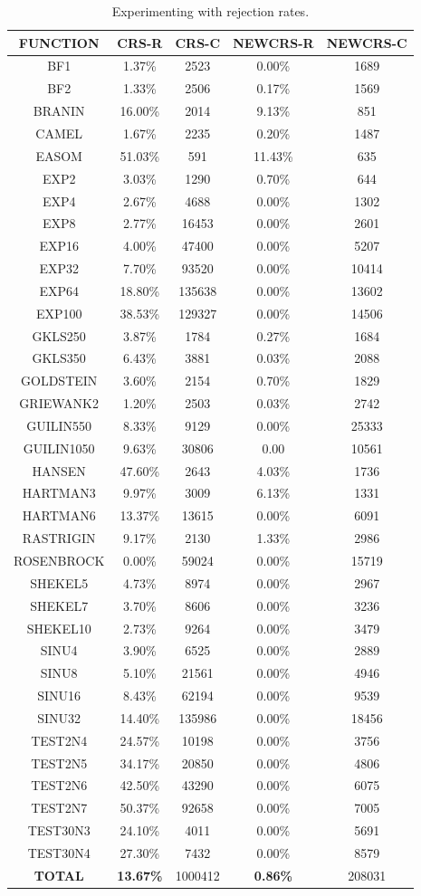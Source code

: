 \documentclass[symmetry,article,submit,moreauthors,pdftex]{mdpi}
\begin{document}
\begin{table}
\caption{Experimenting with rejection rates.\label{tab:Experimenting-with-rejection}}

\begin{centering}
\begin{tabular}{|c|c|c|c|c|}
\hline 
FUNCTION & CRS-R & CRS-C & NEWCRS-R & NEWCRS-C\tabularnewline
\hline 
\hline 
BF1 & 1.37\% & 2523 & 0.00\% & 1689\tabularnewline
\hline 
BF2 & 1.33\% & 2506 & 0.17\% & 1569\tabularnewline
\hline 
BRANIN & 16.00\% & 2014 & 9.13\% & 851\tabularnewline
\hline 
CAMEL & 1.67\% & 2235 & 0.20\% & 1487\tabularnewline
\hline 
EASOM & 51.03\% & 591 & 11.43\% & 635\tabularnewline
\hline 
EXP2 & 3.03\% & 1290 & 0.70\% & 644\tabularnewline
\hline 
EXP4 & 2.67\% & 4688 & 0.00\% & 1302\tabularnewline
\hline 
EXP8 & 2.77\% & 16453 & 0.00\% & 2601\tabularnewline
\hline 
EXP16 & 4.00\% & 47400 & 0.00\% & 5207\tabularnewline
\hline 
EXP32 & 7.70\% & 93520 & 0.00\% & 10414\tabularnewline
\hline 
EXP64 & 18.80\% & 135638 & 0.00\% & 13602\tabularnewline
\hline 
EXP100 & 38.53\% & 129327 & 0.00\% & 14506\tabularnewline
\hline 
GKLS250 & 3.87\% & 1784 & 0.27\% & 1684\tabularnewline
\hline 
GKLS350 & 6.43\% & 3881 & 0.03\% & 2088\tabularnewline
\hline 
GOLDSTEIN & 3.60\% & 2154 & 0.70\% & 1829\tabularnewline
\hline 
GRIEWANK2 & 1.20\% & 2503 & 0.03\% & 2742\tabularnewline
\hline 
GUILIN550 & 8.33\% & 9129 & 0.00\% & 25333\tabularnewline
\hline 
GUILIN1050 & 9.63\% & 30806 & 0.00 & 10561\tabularnewline
\hline 
HANSEN & 47.60\% & 2643 & 4.03\% & 1736\tabularnewline
\hline 
HARTMAN3 & 9.97\% & 3009 & 6.13\% & 1331\tabularnewline
\hline 
HARTMAN6 & 13.37\% & 13615 & 0.00\% & 6091\tabularnewline
\hline 
RASTRIGIN & 9.17\% & 2130 & 1.33\% & 2986\tabularnewline
\hline 
ROSENBROCK & 0.00\% & 59024 & 0.00\% & 15719\tabularnewline
\hline 
SHEKEL5 & 4.73\% & 8974 & 0.00\% & 2967\tabularnewline
\hline 
SHEKEL7 & 3.70\% & 8606 & 0.00\% & 3236\tabularnewline
\hline 
SHEKEL10 & 2.73\% & 9264 & 0.00\% & 3479\tabularnewline
\hline 
SINU4 & 3.90\% & 6525 & 0.00\% & 2889\tabularnewline
\hline 
SINU8 & 5.10\% & 21561 & 0.00\% & 4946\tabularnewline
\hline 
SINU16 & 8.43\% & 62194 & 0.00\% & 9539\tabularnewline
\hline 
SINU32 & 14.40\% & 135986 & 0.00\% & 18456\tabularnewline
\hline 
TEST2N4 & 24.57\% & 10198 & 0.00\% & 3756\tabularnewline
\hline 
TEST2N5 & 34.17\% & 20850 & 0.00\% & 4806\tabularnewline
\hline 
TEST2N6 & 42.50\% & 43290 & 0.00\% & 6075\tabularnewline
\hline 
TEST2N7 & 50.37\% & 92658 & 0.00\% & 7005\tabularnewline
\hline 
TEST30N3 & 24.10\% & 4011 & 0.00\% & 5691\tabularnewline
\hline 
TEST30N4 & 27.30\% & 7432 & 0.00\% & 8579\tabularnewline
\hline 
\textbf{TOTAL} & \textbf{13.67\%} & 1000412 & \textbf{0.86\%} & 208031\tabularnewline
\hline 
\end{tabular}
\par\end{centering}
\end{table}
\end{document}
